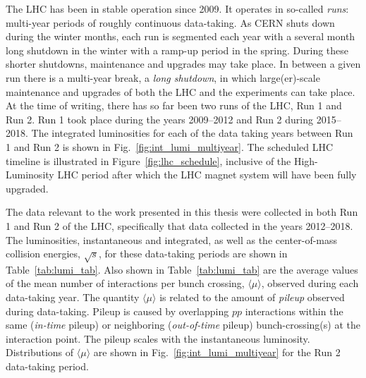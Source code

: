 The LHC has been in stable operation since 2009.
It operates in so-called \textit{runs}: multi-year periods of roughly continuous
data-taking.
As CERN shuts down during the winter months, each run is segmented each year
with a several month long shutdown in the winter with a ramp-up period in the spring.
During these shorter shutdowns, maintenance and upgrades may take place.
In between a given run there is a multi-year break, a \textit{long shutdown},
in which large(er)-scale maintenance and upgrades of both the LHC and the experiments can take place.
At the time of writing, there has so far been two runs of the LHC, Run 1 and Run 2.
Run 1 took place during the years 2009--2012 and Run 2 during 2015--2018.
The integrated luminosities for each of the data taking years between Run 1 and Run 2
is shown in Fig.~\ref{fig:int_lumi_multiyear}.
The scheduled LHC timeline is illustrated in Figure~\ref{fig:lhc_schedule}, inclusive of the
High-Luminosity LHC period after which the LHC magnet system will have been fully upgraded.

The data relevant to the work presented in this thesis were collected in both
Run 1 and Run 2 of the LHC, specifically that data collected in the years 2012--2018.
The luminosities, instantaneous and integrated, as well as the center-of-mass collision energies, $\sqrt{s}$, for these data-taking periods are
shown in Table~\ref{tab:lumi_tab}.
Also shown in Table~\ref{tab:lumi_tab} are the average values of the mean number of interactions per bunch
crossing, $\langle \mu \rangle$, observed during each data-taking year. The quantity $\langle \mu \rangle$
is related to the amount of \textit{pileup} observed during data-taking. Pileup is caused
by overlapping $pp$ interactions within the same (\textit{in-time} pileup) or neighboring (\textit{out-of-time} pileup)
bunch-crossing(s) at the interaction point. The pileup scales with the instantaneous luminosity.
Distributions of $\langle \mu \rangle$ are shown in Fig.~\ref{fig:int_lumi_multiyear} for
the Run 2 data-taking period.



